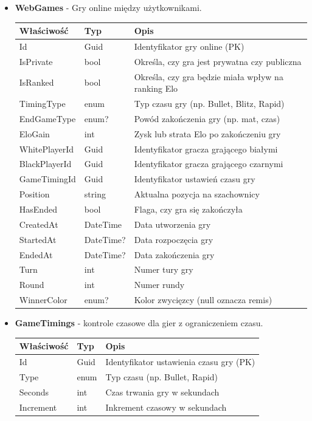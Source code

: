 \documentclass[12pt,a4paper]{article}
\begin{document}
\begin{itemize}
    \item \textbf{WebGames} - Gry online między użytkownikami.
    \begin{longtable}{|m{4cm}|m{2cm}|m{8cm}|}
        \hline
        \textbf{Właściwość} & \textbf{Typ} & \textbf{Opis} \\ \hline
        \endhead
        \hline
        Id & Guid & Identyfikator gry online (PK) \\ \hline
        IsPrivate & bool & Określa, czy gra jest prywatna czy publiczna \\ \hline
        IsRanked & bool & Określa, czy gra będzie miała wpływ na ranking Elo \\ \hline
        TimingType & enum & Typ czasu gry (np. Bullet, Blitz, Rapid) \\ \hline
        EndGameType & enum? & Powód zakończenia gry (np. mat, czas) \\ \hline
        EloGain & int & Zysk lub strata Elo po zakończeniu gry \\ \hline
        WhitePlayerId & Guid & Identyfikator gracza grającego białymi \\ \hline
        BlackPlayerId & Guid & Identyfikator gracza grającego czarnymi \\ \hline
        GameTimingId & Guid & Identyfikator ustawień czasu gry \\ \hline
        Position & string & Aktualna pozycja na szachownicy \\ \hline
        HasEnded & bool & Flaga, czy gra się zakończyła \\ \hline
        CreatedAt & DateTime & Data utworzenia gry \\ \hline
        StartedAt & DateTime? & Data rozpoczęcia gry \\ \hline
        EndedAt & DateTime? & Data zakończenia gry \\ \hline
        Turn & int & Numer tury gry \\ \hline
        Round & int & Numer rundy \\ \hline
        WinnerColor & enum? & Kolor zwycięzcy (null oznacza remis) \\ \hline
    \end{longtable}
        
        
 
    \item \textbf{GameTimings} - kontrole czasowe dla gier z ograniczeniem czasu.
    \begin{longtable}{|m{4cm}|m{2cm}|m{8cm}|}
        \hline
        \textbf{Właściwość} & \textbf{Typ} & \textbf{Opis} \\ \hline
        \endhead
        \hline
        Id & Guid & Identyfikator ustawienia czasu gry (PK) \\ \hline
        Type & enum & Typ czasu (np. Bullet, Rapid) \\ \hline
        Seconds & int & Czas trwania gry w sekundach \\ \hline
        Increment & int & Inkrement czasowy w sekundach \\ \hline
    \end{longtable}
        


\end{itemize}
\end{document}
